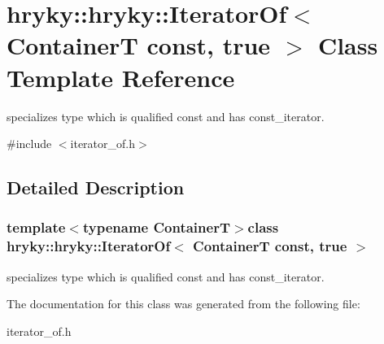\hypertarget{classhryky_1_1hryky_1_1_iterator_of_3_01_container_t_01const_00_01true_01_4}{\section{hryky\-:\-:hryky\-:\-:Iterator\-Of$<$ Container\-T const, true $>$ Class Template Reference}
\label{classhryky_1_1hryky_1_1_iterator_of_3_01_container_t_01const_00_01true_01_4}
}


specializes type which is qualified const and has const\-\_\-iterator.  




{\ttfamily \#include $<$iterator\-\_\-of.\-h$>$}



\subsection{Detailed Description}
\subsubsection*{template$<$typename Container\-T$>$class hryky\-::hryky\-::\-Iterator\-Of$<$ Container\-T const, true $>$}

specializes type which is qualified const and has const\-\_\-iterator. 

The documentation for this class was generated from the following file\-:\begin{DoxyCompactItemize}
\item 
iterator\-\_\-of.\-h\end{DoxyCompactItemize}
